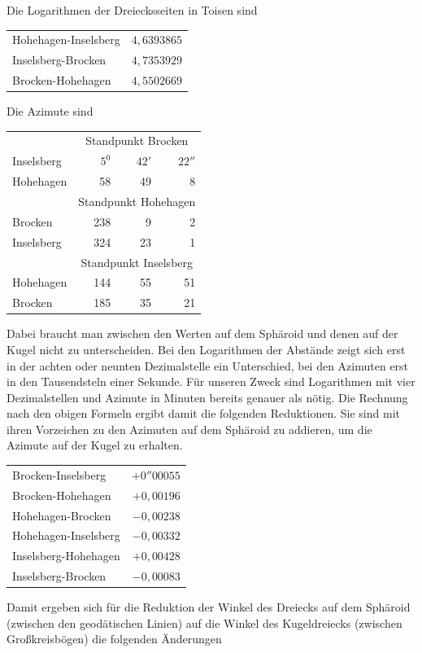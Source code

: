 \hspace*{\parindent}Die Logarithmen der Dreiecksseiten in Toisen sind
\begin{center}
\begin{tabular}{lr}
Hohehagen-Inselsberg&\(4{,}6393865\)\\
Inselsberg-Brocken&\(4{,}7353929\)\\
Brocken-Hohehagen&\(4{,}5502669\)
\end{tabular}
\end{center}
\hspace*{\parindent}Die Azimute sind
\begin{center}
\begin{tabular}{lrrr}
&\multicolumn{3}{c}{Standpunkt Brocken}\\
Inselsberg&\(5^0\)&\(42'\)&\(22''\)\\
Hohehagen&58&49&8\\
&\multicolumn{3}{c}{Standpunkt Hohehagen}\\
Brocken&238&9&2\\
Inselsberg&324&23&1\\
&\multicolumn{3}{c}{Standpunkt Inselsberg}\\
Hohehagen&144&55&51\\
Brocken&185&35&21
\end{tabular}
\end{center}
\hspace*{\parindent}Dabei braucht man zwischen den Werten auf dem Sphäroid und denen auf der Kugel nicht zu unterscheiden. Bei den Logarithmen der Abstände zeigt sich erst in der achten oder neunten Dezimalstelle ein Unterschied, bei den Azimuten erst in den Tausendsteln einer Sekunde. Für unseren Zweck sind Logarithmen mit vier Dezimalstellen und Azimute in Minuten bereits genauer als nötig. Die Rechnung nach den obigen Formeln ergibt damit die folgenden Reduktionen. Sie sind mit ihren Vorzeichen zu den Azimuten auf dem Sphäroid zu addieren, um die Azimute auf der Kugel zu erhalten.
\begin{center}
\begin{tabular}{lr}
Brocken-Inselsberg&\(+0''00055\)\\
Brocken-Hohehagen&\(+0{,}00196\)\\
Hohehagen-Brocken&\(-0{,}00238\)\\
Hohehagen-Inselsberg&\(-0{,}00332\)\\
Inselsberg-Hohehagen&\(+0{,}00428\)\\
Inselsberg-Brocken&\(-0{,}00083\)
\end{tabular}
\end{center}
\hspace*{\parindent}Damit ergeben sich für die Reduktion der Winkel des Dreiecks auf dem Sphäroid (zwischen den geodätischen Linien) auf die Winkel des Kugeldreiecks (zwischen Großkreisbögen) die folgenden Änderungen

